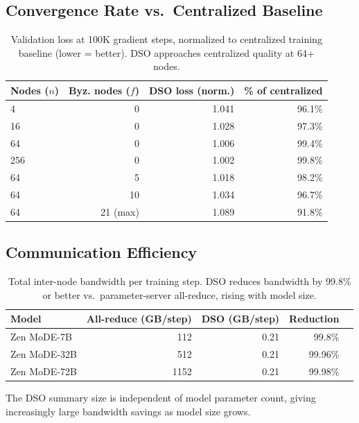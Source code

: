 \documentclass[11pt,a4paper]{article}
\begin{document}
\subsection{Convergence Rate vs.\ Centralized Baseline}

\begin{table}[H]
\centering
\caption{Validation loss at 100K gradient steps, normalized to centralized training
baseline (lower = better). DSO approaches centralized quality at 64+ nodes.}
\begin{tabular}{lrrr}
\toprule
\textbf{Nodes ($n$)} & \textbf{Byz. nodes ($f$)} & \textbf{DSO loss (norm.)} & \textbf{\% of centralized} \\
\midrule
4   & 0 & 1.041 & 96.1\% \\
16  & 0 & 1.028 & 97.3\% \\
64  & 0 & 1.006 & 99.4\% \\
256 & 0 & 1.002 & 99.8\% \\
64  & 5 & 1.018 & 98.2\% \\
64  & 10 & 1.034 & 96.7\% \\
64  & 21 (max) & 1.089 & 91.8\% \\
\bottomrule
\end{tabular}
\label{tab:convergence}
\end{table}

\subsection{Communication Efficiency}

\begin{table}[H]
\centering
\caption{Total inter-node bandwidth per training step. DSO reduces bandwidth by
99.8\% or better vs.\ parameter-server all-reduce, rising with model size.}
\begin{tabular}{lrrrr}
\toprule
\textbf{Model} & \textbf{All-reduce (GB/step)} & \textbf{DSO (GB/step)} & \textbf{Reduction} \\
\midrule
Zen MoDE-7B  & 112 & 0.21 & 99.8\% \\
Zen MoDE-32B & 512 & 0.21 & 99.96\% \\
Zen MoDE-72B & 1152 & 0.21 & 99.98\% \\
\bottomrule
\end{tabular}
\label{tab:bandwidth}
\end{table}

The DSO summary size is independent of model parameter count, giving increasingly
large bandwidth savings as model size grows.
\end{document}
